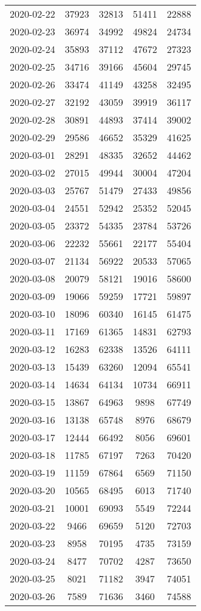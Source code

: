 \begin{longtable}{ccccc}
2020-02-22&37923&32813&51411&22888\\
2020-02-23&36974&34992&49824&24734\\
2020-02-24&35893&37112&47672&27323\\
2020-02-25&34716&39166&45604&29745\\
2020-02-26&33474&41149&43258&32495\\
2020-02-27&32192&43059&39919&36117\\
2020-02-28&30891&44893&37414&39002\\
2020-02-29&29586&46652&35329&41625\\
2020-03-01&28291&48335&32652&44462\\
2020-03-02&27015&49944&30004&47204\\
2020-03-03&25767&51479&27433&49856\\
2020-03-04&24551&52942&25352&52045\\
2020-03-05&23372&54335&23784&53726\\
2020-03-06&22232&55661&22177&55404\\
2020-03-07&21134&56922&20533&57065\\
2020-03-08&20079&58121&19016&58600\\
2020-03-09&19066&59259&17721&59897\\
2020-03-10&18096&60340&16145&61475\\
2020-03-11&17169&61365&14831&62793\\
2020-03-12&16283&62338&13526&64111\\
2020-03-13&15439&63260&12094&65541\\
2020-03-14&14634&64134&10734&66911\\
2020-03-15&13867&64963&9898&67749\\
2020-03-16&13138&65748&8976&68679\\
2020-03-17&12444&66492&8056&69601\\
2020-03-18&11785&67197&7263&70420\\
2020-03-19&11159&67864&6569&71150\\
2020-03-20&10565&68495&6013&71740\\
2020-03-21&10001&69093&5549&72244\\
2020-03-22&9466&69659&5120&72703\\
2020-03-23&8958&70195&4735&73159\\
2020-03-24&8477&70702&4287&73650\\
2020-03-25&8021&71182&3947&74051\\
2020-03-26&7589&71636&3460&74588\\

\end{longtable}
